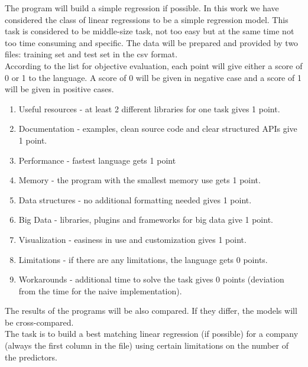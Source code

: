 \documentclass [twoside,
  11pt, a4paper,
  footinclude=true,
  headinclude=true,
  cleardoublepage=empty
]{article}
\begin{document}
The program will build a simple regression if possible. In this work we have considered the class of linear regressions to be a simple regression model. This task is considered to be middle-size task, not too easy but at the same time not too time consuming and specific.
The data will be prepared and provided by two files: training set and test set in the csv format.\\
According to the list for objective evaluation, each point will give either a score of 0 or 1 to the language. A score of 0 will be given in negative case and a score of 1 will be given in positive cases.
\begin{enumerate}
    \item[] Useful resources - at least 2 different libraries for one task gives 1 point.
    \item[] Documentation - examples, clean source code and clear structured APIs give 1 point.
    \item[] Performance - fastest language gets 1 point
    \item[] Memory - the program with the smallest memory use gets 1 point.
    \item[] Data structures - no additional formatting needed gives 1 point.
    \item[] Big Data - libraries, plugins and frameworks for big data give 1 point.
    \item[] Visualization - easiness in use and customization gives 1 point.
    \item[] Limitations - if there are any limitations, the language gets 0 points.
    \item[] Workarounds - additional time to solve the task gives 0 points (deviation from the time for the naive implementation).
\end{enumerate}
The results of the programs will be also compared. If they differ, the models will be cross-compared.\\
The task is to build a best matching linear regression (if possible) for a company (always the first column in the file) using certain limitations on the number of the predictors.
\end{document}
